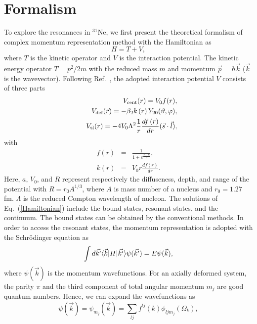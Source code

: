 \documentclass[twocolumn,prc,showpacs,preprintnumbers,superscriptaddress,floatfix]{revtex4}
\begin{document}
\section{Formalism}

To explore the resonances in $^{31}$Ne, we first present the theoretical
formalism of complex momentum representation method with the Hamiltonian as
\begin{equation}
H=T+V,  \label{Hamiltonian}
\end{equation}%
where $T$ is the kinetic operator and $V$ is the interaction potential. The
kinetic energy operator $T=p^{2}/2m$ with the reduced mass $m$ and momentum $%
\vec{p}=\hbar \vec{k}$ ($\vec{k}$ is the wavevector). Following Ref.~\cite%
{Hamamoto2005}, the adopted interaction potential $V$ consists of three
parts
\begin{eqnarray}
&&V_{\text{cent}}(r)=V_{0}f(r),  \notag \\
&&V_{\text{def}}(\vec{r})=-\beta _{2}k\left( r\right) Y_{20}(\vartheta
,\varphi ),  \label{potential} \\
&&V_{\text{sl}}(r)=-4V_{0}\Lambda ^{2}\frac{1}{r}\frac{df\left( r\right) }{dr%
}(\vec{s}\cdot \vec{l}),  \notag
\end{eqnarray}%
with%
\begin{eqnarray*}
f(r) &=&\frac{1}{1+e^{\frac{r-R}{a}}}, \\
k(r) &=&V_{0}r\frac{df\left( r\right) }{dr}.
\end{eqnarray*}%
Here, $a$, $V_{0}$, and $R$ represent respectively the diffuseness, depth,
and range of the potential with $R=r_{0}A^{1/3}$, where $A$ is mass number
of a nucleus and $r_{0}=1.27$ fm. $\Lambda $ is the reduced Compton
wavelength of nucleon. The solutions of Eq.~(\ref{Hamiltonian}) include the
bound states, resonant states, and the continuum. The bound states can be
obtained by the conventional methods. In order to access the resonant
states, the momentum representation is adopted with the Schr\"{o}dinger
equation as
\begin{equation}
\int d\vec{k^{\prime }}\langle \vec{k}|H|\vec{k^{\prime }}\rangle \psi (\vec{%
k^{\prime }})=E\psi (\vec{k}),  \label{scheq}
\end{equation}%
where $\psi (\vec{k})$ is the momentum wavefunctions. For an axially
deformed system, the parity $\pi $ and the third component of total angular
momentum $m_{j}$ are good quantum numbers. Hence, we can expand the
wavefunctions as
\begin{equation}
\psi (\vec{k})=\psi _{m_{j}}(\vec{k})=\sum_{lj}f^{lj}(k)\phi
_{ljm_{j}}(\Omega _{k}),  \label{wavefunction}
\end{equation}%
\end{document}
